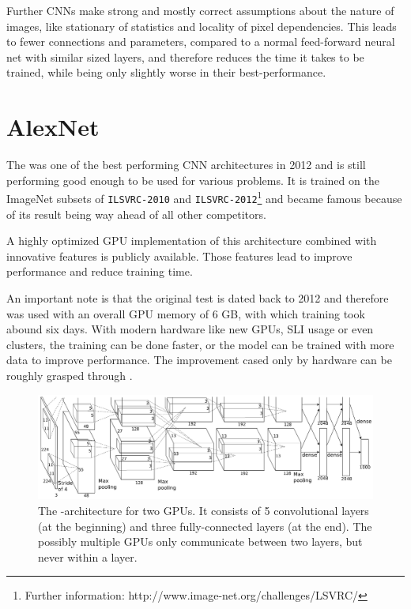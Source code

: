 Further CNNs make strong and mostly correct assumptions about the nature of images, like stationary of statistics and locality of pixel dependencies. This leads to fewer connections and parameters, compared to a normal feed-forward neural net with similar sized layers, and therefore reduces the time it takes to be trained, while being only slightly worse in their best-performance. \cite{krizhevsky2012imagenet}

\section{AlexNet} \label{sec: AlexNet}

The \textit{\alexnet} was one of the best performing CNN architectures in 2012 and is still performing good enough to be used for various problems. It is trained on the ImageNet subsets of \texttt{ILSVRC-2010} and \texttt{ILSVRC-2012}\footnote{Further information: http://www.image-net.org/challenges/LSVRC/} and became famous because of its result being way ahead of all other competitors.

A highly optimized GPU implementation of this architecture combined with innovative features is publicly available. Those features lead to improve performance and reduce training time.\cite{krizhevsky2012imagenet}

An important note is that the original test is dated back to 2012 and therefore was used with an overall GPU memory of 6 GB, with which training took abound six days. With modern hardware like new GPUs, SLI usage or even clusters, the training can be done faster, or the model can be trained with more data to improve performance. The improvement cased only by hardware can be roughly grasped through \cite{sze2017hardware}.


\begin{figure}[ht]
	\includegraphics[scale = 0.5]{src/pic/AlexNet-structure.PNG}
	\caption{The \alexnet-architecture for two GPUs. It consists of 5 convolutional layers (at the beginning) and three fully-connected layers (at the end). The possibly multiple GPUs only communicate between two layers, but never within a layer.\cite{krizhevsky2012imagenet}}
	\label{pic: AlexNet}
\end{figure}